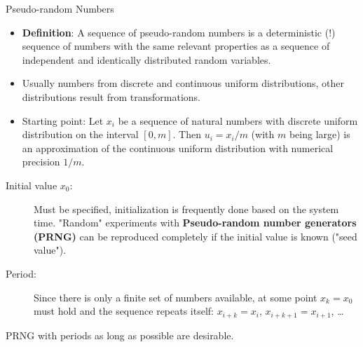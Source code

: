 \documentclass[11pt,compress,t,notes=noshow, xcolor=table]{beamer}
\begin{document}
\begin{vbframe}{Pseudo-random Numbers}
\begin{itemize}
 \item \textbf{Definition}: A sequence of pseudo-random numbers is a
  deterministic (!) sequence of numbers with the same relevant
  properties as a sequence of independent and identically distributed
  random variables.
 \item Usually numbers from discrete and continuous uniform distributions,
  other distributions result from transformations.
 \item Starting point: Let $x_i$ be a sequence of natural numbers with discrete uniform distribution on the
  interval $[0,m]$. Then $u_i=x_i/m$ (with $m$ being large) is an approximation of the continuous uniform distribution with numerical precision $1/m$.
\end{itemize}


\framebreak

\begin{description}
 \item[Initial value $x_0$:] Must be specified, initialization is frequently done based on the system time. "Random" experiments with
  \textbf{Pseudo-random number generators (PRNG)} can be reproduced completely
  if the initial value is known ("seed value").
 \item[Period:] Since there is only a finite set of numbers available, at some point $x_k=x_0$ must hold and the sequence repeats itself: $x_{i+k}=x_i$, $x_{i+k+1}=x_{i+1}$, \ldots
\end{description}

\lz

PRNG with periods as long as possible are desirable.

\end{vbframe}


\end{document}
